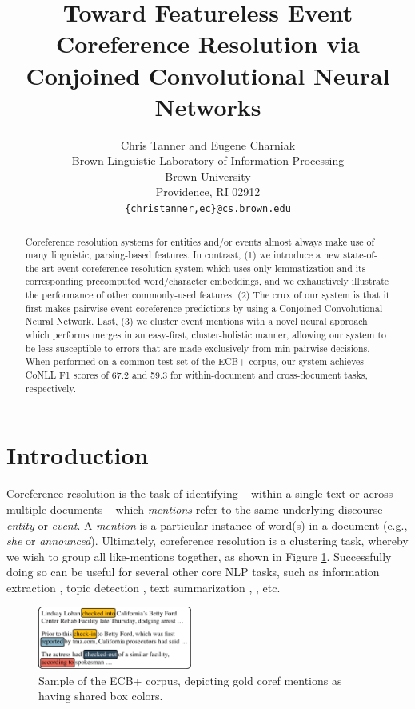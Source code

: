 \documentclass[11pt,a4paper]{article}
\title{Toward Featureless Event Coreference Resolution via Conjoined Convolutional Neural Networks}
\author{Chris Tanner \textnormal{and} Eugene Charniak\\
Brown Linguistic Laboratory of Information Processing \\
  Brown University \\
  Providence, RI  02912 \\
  {\tt \{christanner,ec\}@cs.brown.edu} \\}
\date{}
\begin{document}
\maketitle
\begin{abstract}
Coreference resolution systems for entities and/or events almost always make use of many linguistic, parsing-based features.  In contrast, (1) we introduce a new state-of-the-art event coreference resolution system which uses only lemmatization and its corresponding precomputed word/character embeddings, and we exhaustively illustrate the performance of other commonly-used features.  (2) The crux of our system is that it first makes pairwise event-coreference predictions by using a Conjoined Convolutional Neural Network.  Last, (3) we cluster event mentions with a novel neural approach which performs merges in an easy-first, cluster-holistic manner, allowing our system to be less susceptible to errors that are made exclusively from min-pairwise decisions.  When performed on a common test set of the ECB+ corpus, our system achieves CoNLL F1 scores of 67.2 and 59.3 for within-document and cross-document tasks, respectively.
\end{abstract}


\section{Introduction}
Coreference resolution is the task of identifying -- within a single text or across multiple documents -- which \textit{mentions} refer to the same underlying discourse \textit{entity} or \textit{event}.  A \textit{mention} is a particular instance of word(s) in a document (e.g., \textit{she} or \textit{announced}).  Ultimately, coreference resolution is a clustering task, whereby we wish to group all like-mentions together, as shown in Figure \ref{fig:corpus}.  Successfully doing so can be useful for several other core NLP tasks, such as information extraction \cite{Humphreys:1997}, topic detection \cite{Allan:1998}, text summarization \cite{Daniel:2003}, \cite{Narayanan:2004:QAB:1220355.1220455}, etc.

\begin{figure}[ht]
\centering
	\includegraphics[width=0.45\textwidth]{corpus}
	\caption{Sample of the ECB+ corpus, depicting gold coref mentions as having shared box colors.}
	\label{fig:corpus}
\end{figure}
\end{document}
